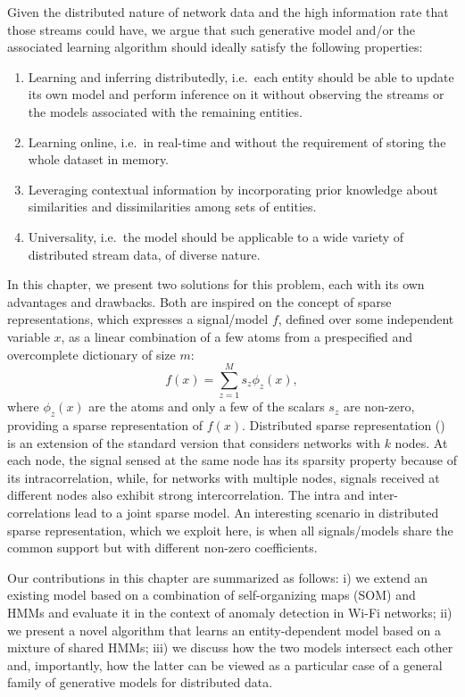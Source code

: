 Given the distributed nature of network data and the high information rate that those streams could have, we argue that such generative model and/or the associated learning algorithm should ideally satisfy the following properties:
\begin{enumerate}
	\item Learning and inferring distributedly, i.e.\ each entity should be able to update its own model and perform inference on it without observing the streams or the models associated with the remaining entities.
	\item Learning online, i.e.\ in real-time and without the requirement of storing the whole dataset in memory.
	\item Leveraging contextual information by incorporating prior knowledge about similarities and dissimilarities among sets of entities.
	\item Universality, i.e.\ the model should be applicable to a wide variety of distributed stream data, of diverse nature.
\end{enumerate}
In this chapter, we present two solutions for this problem, each with its own advantages and drawbacks. Both are inspired on the concept of sparse representations, which expresses a signal/model $f$, defined over some independent variable $x$, as a linear combination of a few atoms from a prespecified and overcomplete dictionary of size $m$:
\begin{equation}
\label{eq:sparse_coding}
f(x)=\sum_{z=1}^M s_z \phi_z(x),
\end{equation}
where $\phi_z(x)$ are the atoms and only a few of the scalars $s_z$ are non-zero, providing a sparse representation of $f(x)$.  Distributed sparse representation (\citet{Baron}) is an extension of the standard version that considers networks with $k$ nodes. At each node, the signal sensed at the same node has its sparsity property because of its intracorrelation, while, for networks with multiple nodes, signals received at different nodes also exhibit strong intercorrelation.
The intra and inter-correlations lead to a joint sparse model. An interesting scenario in distributed sparse representation, which we exploit here, is when all signals/models share the common support but with different non-zero coefficients.

Our contributions in this chapter are summarized as follows: i) we extend an existing model based on a combination of self-organizing maps (SOM) and HMMs and evaluate it in the context of anomaly detection in Wi-Fi networks; ii) we present a novel algorithm that learns an entity-dependent model based on a mixture of shared HMMs; iii) we discuss how the two models intersect each other and, importantly, how the latter can be viewed as a particular case of a general family of generative models for distributed data.

